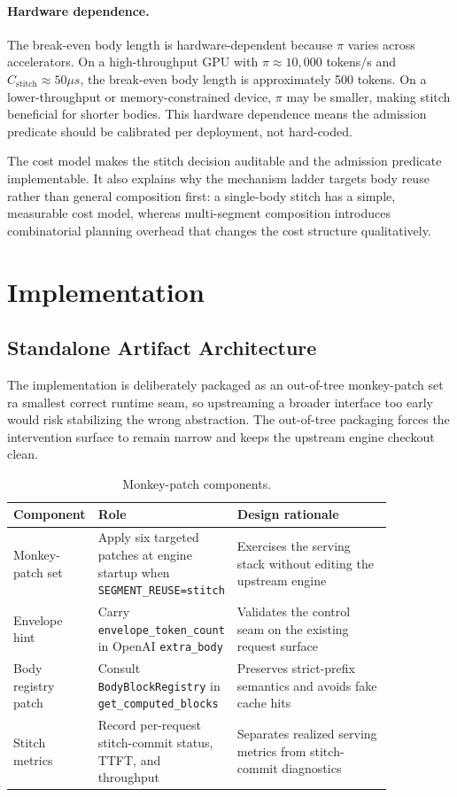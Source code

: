 \documentclass[conference]{IEEEtran}
\begin{document}
\paragraph{Hardware dependence.}
The break-even body length is hardware-dependent because $\pi$ varies across accelerators. On a high-throughput GPU with $\pi \approx 10{,}000$ tokens/s and $C_{\text{stitch}} \approx 50\mu s$, the break-even body length is approximately 500 tokens. On a lower-throughput or memory-constrained device, $\pi$ may be smaller, making stitch beneficial for shorter bodies. This hardware dependence means the admission predicate should be calibrated per deployment, not hard-coded.

The cost model makes the stitch decision auditable and the admission predicate implementable. It also explains why the mechanism ladder targets body reuse rather than general composition first: a single-body stitch has a simple, measurable cost model, whereas multi-segment composition introduces combinatorial planning overhead that changes the cost structure qualitatively.

\section{Implementation}
\label{sec:impl}

\subsection{Standalone Artifact Architecture}

The implementation is deliberately packaged as an out-of-tree monkey-patch set ra smallest correct runtime seam, so upstreaming a broader interface too early would risk stabilizing the wrong abstraction. The out-of-tree packaging forces the intervention surface to remain narrow and keeps the upstream engine checkout clean.

\begin{table}[t]
\caption{Monkey-patch components.}
\label{tab:prototype-components}
\centering
\footnotesize
\setlength{\tabcolsep}{3pt}
\begin{tabular}{@{}P{0.18\linewidth}P{0.25\linewidth}P{0.42\linewidth}@{}}
\toprule
Component & Role & Design rationale \\
\midrule
Monkey-patch set & Apply six targeted patches at engine startup when \texttt{SEGMENT\_REUSE=stitch} & Exercises the serving stack without editing the upstream engine \\
Envelope hint & Carry \texttt{envelope\_token\_count} in OpenAI \texttt{extra\_body} & Validates the control seam on the existing request surface \\
Body registry patch & Consult \texttt{BodyBlockRegistry} in \texttt{get\_computed\_blocks} & Preserves strict-prefix semantics and avoids fake cache hits \\
Stitch metrics & Record per-request stitch-commit status, TTFT, and throughput & Separates realized serving metrics from stitch-commit diagnostics \\
\bottomrule
\end{tabular}
\end{table}
\end{document}
